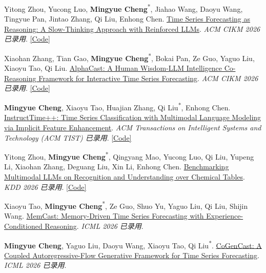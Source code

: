 \documentclass[UTF8,fontset=fandol,scheme=plain,11pt,a4paper]{ctexart}
\newcommand{\pubentry}[1]{\item \begin{minipage}[t]{\linewidth}#1\end{minipage}}
\begin{document}
\begin{publist}[start=4]
\pubentry{Yitong Zhou, Yucong Luo, \textbf{Mingyue Cheng}\textsuperscript{*}, Jiahao Wang, Daoyu Wang, Tingyue Pan, Jintao Zhang, Qi Liu, Enhong Chen. \href{https://arxiv.org/pdf/2506.10630}{Time Series Forecasting as Reasoning: A Slow-Thinking Approach with Reinforced LLMs}. \emph{ACM CIKM 2026 已录用}. \href{https://github.com/lqzxt/Time-R1}{[Code]}}

\pubentry{Xiaohan Zhang, Tian Gao, \textbf{Mingyue Cheng}\textsuperscript{*}, Bokai Pan, Ze Guo, Yaguo Liu, Xiaoyu Tao, Qi Liu. \href{https://arxiv.org/pdf/2511.08947}{AlphaCast: A Human Wisdom-LLM Intelligence Co-Reasoning Framework for Interactive Time Series Forecasting}. \emph{ACM CIKM 2026 已录用}. \href{https://github.com/SkyeGT/AlphaCast\_Official}{[Code]}}

\pubentry{\textbf{Mingyue Cheng}, Xiaoyu Tao, Huajian Zhang, Qi Liu\textsuperscript{*}, Enhong Chen. \href{https://arxiv.org/pdf/2601.14968}{InstructTime++: Time Series Classification with Multimodal Language Modeling via Implicit Feature Enhancement}. \emph{ACM Transactions on Intelligent Systems and Technology (ACM TIST) 已录用}. \href{https://github.com/Mingyue-Cheng/InstructTime}{[Code]}}

\pubentry{Yitong Zhou, \textbf{Mingyue Cheng}\textsuperscript{*}, Qingyang Mao, Yucong Luo, Qi Liu, Yupeng Li, Xiaohan Zhang, Deguang Liu, Xin Li, Enhong Chen. \href{https://arxiv.org/pdf/2506.11375}{Benchmarking Multimodal LLMs on Recognition and Understanding over Chemical Tables}. \emph{KDD 2026 已录用}. \href{https://github.com/ustc-ai4science/ChemTable}{[Code]}}

\pubentry{Xiaoyu Tao, \textbf{Mingyue Cheng}\textsuperscript{*}, Ze Guo, Shuo Yu, Yaguo Liu, Qi Liu, Shijin Wang. \href{https://www.arxiv.org/pdf/2602.03164}{MemCast: Memory-Driven Time Series Forecasting with Experience-Conditioned Reasoning}. \emph{ICML 2026 已录用}.}

\pubentry{\textbf{Mingyue Cheng}, Yaguo Liu, Daoyu Wang, Xiaoyu Tao, Qi Liu\textsuperscript{*}. \href{https://arxiv.org/pdf/2602.03564}{CoGenCast: A Coupled Autoregressive-Flow Generative Framework for Time Series Forecasting}. \emph{ICML 2026 已录用}.}


\end{publist}
\end{document}
